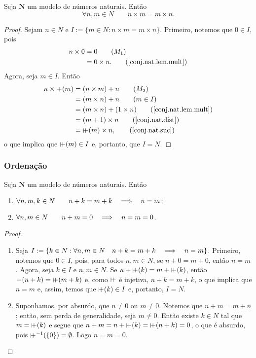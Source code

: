 \begin{theorem}
	Seja $\bm N$ um modelo de números naturais. Então
	\begin{equation*}
	\forall n,m \in N \qquad n \times m = m \times n.
	\end{equation*}
\end{theorem}
\begin{proof}
	Sejam $n \in N$ e $I := \{m \in N:n \times m=m \times n\}$. Primeiro, notemos que $0 \in I$, pois
	\begin{align*}
	n \times 0 &= 0 													\tag{$M_1$} \\
		&= 0 \times n.													\tag{\ref{conj.nat.lem.mult}}
	\end{align*}
Agora, seja $m \in I$. Então
	\begin{align*}
	n \times \suce(m) &= (n \times m) + n							\tag{$M_2$} \\
		&= (m \times n) + n											\tag{$m \in I$} \\
		&= (m \times n) + (1 \times n)							\tag{\ref{conj.nat.lem.mult}} \\
		&= (m +1) \times n											\tag{\ref{conj.nat.dist}} \\
		&= \suce(m) \times n,												\tag{\ref{conj.nat.suc}}
	\end{align*}
o que implica que $\suce(m) \in I$ e, portanto, que $I=N$.
\end{proof}

\subsubsection{Ordenação}

\begin{lemma}
	Seja $\bm N$ um modelo de números naturais. Então
	\begin{enumerate}
	\item $\forall n,m,k \in N \qquad n+k=m+k \quad \Longrightarrow \quad n=m$;
	\item $\forall n,m \in N \qquad n+m = 0 \quad \Longrightarrow \quad n=m=0$.
	\end{enumerate}
\end{lemma}
\begin{proof}
	\begin{enumerate}
	\item Seja $I := \{k \in N: \forall n,m \in N \quad n+k=m+k \quad \Longrightarrow \quad n=m\}$. Primeiro, notemos que $0 \in I$, pois, para todos $n,m \in N$, se $n+0=m+0$, então $n=m$. Agora, seja $k \in I$ e $n,m \in N$. Se $n+\suce(k)=m+\suce(k)$, então $\suce(n+k)=\suce(m+k)$ e, como $\suce$ é injetiva, $n+k=m+k$, o que implica que $n=m$ e, assim, temos que $\suce(k) \in I$ e, portanto, $I=N$.

	\item Suponhamos, por absurdo, que $n \neq 0$ ou $m \neq 0$. Notemos que $n+m=m+n$; então, sem perda de generalidade, seja $m \neq 0$. Então existe $k \in N$ tal que $m=\suce(k)$ e segue que $n+m=n+\suce(k)=\suce(n+k)=0$, o que é absurdo, pois $\suce\inv(\{0\})=\emptyset$. Logo $n=m=0$.
	\end{enumerate}
\end{proof}

